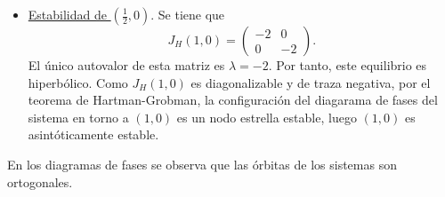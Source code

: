 \documentclass[11pt]{report}
\begin{document}
\begin{solution}
\begin{enumerate}
\begin{itemize}
            \item \underline{Estabilidad de $(\frac{1}{2},0)$}. Se tiene que
            \[J_H(1,0) = \left(\begin{array}{cc}
                -2 & 0 \\
                0 & -2
            \end{array}\right).\]
            El único autovalor de esta matriz es $\lambda = -2$. Por tanto, este equilibrio es hiperbólico. Como $J_H(1,0)$ es diagonalizable y de traza negativa, por el teorema de Hartman-Grobman, la configuración del diagarama de fases del sistema en torno a $(1,0)$ es un nodo estrella estable, luego $(1,0)$ es asintóticamente estable.
        \end{itemize}
        En los diagramas de fases se observa que las órbitas de los sistemas son ortogonales.
    \end{enumerate}
\end{solution}

\addtocounter{exercise}{-4}
\end{document}
